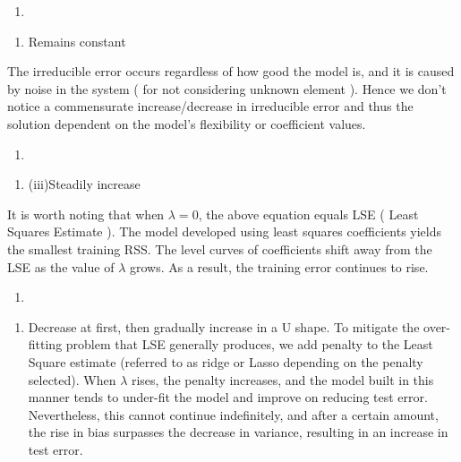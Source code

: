 \documentclass[
]{article}
\providecommand{\tightlist}{%
  \setlength{\itemsep}{0pt}\setlength{\parskip}{0pt}}
\begin{document}
\begin{enumerate}
\def\labelenumi{\alph{enumi})}
\setcounter{enumi}{4}
\tightlist
\item
\end{enumerate}

\begin{enumerate}
\def\labelenumi{(\alph{enumi})}
\setcounter{enumi}{21}
\tightlist
\item
  Remains constant
\end{enumerate}

The irreducible error occurs regardless of how good the model is, and it
is caused by noise in the system ( for not considering unknown element
). Hence we don't notice a commensurate increase/decrease in irreducible
error and thus the solution dependent on the model's flexibility or
coefficient values.

\begin{enumerate}
\def\labelenumi{\arabic{enumi})}
\setcounter{enumi}{3}
\tightlist
\item
\end{enumerate}

\begin{enumerate}
\def\labelenumi{\alph{enumi})}
\tightlist
\item
  (iii)Steadily increase
\end{enumerate}

It is worth noting that when \(\lambda=0\), the above equation equals
LSE ( Least Squares Estimate ). The model developed using least squares
coefficients yields the smallest training RSS. The level curves of
coefficients shift away from the LSE as the value of \(\lambda\) grows.
As a result, the training error continues to rise.

\begin{enumerate}
\def\labelenumi{\alph{enumi})}
\setcounter{enumi}{1}
\tightlist
\item
\end{enumerate}

\begin{enumerate}
\def\labelenumi{(\roman{enumi})}
\setcounter{enumi}{1}
\tightlist
\item
  Decrease at first, then gradually increase in a U shape. To mitigate
  the over-fitting problem that LSE generally produces, we add penalty
  to the Least Square estimate (referred to as ridge or Lasso depending
  on the penalty selected). When \(\lambda\) rises, the penalty
  increases, and the model built in this manner tends to under-fit the
  model and improve on reducing test error. Nevertheless, this cannot
  continue indefinitely, and after a certain amount, the rise in bias
  surpasses the decrease in variance, resulting in an increase in test
  error.
\end{enumerate}
\end{document}
